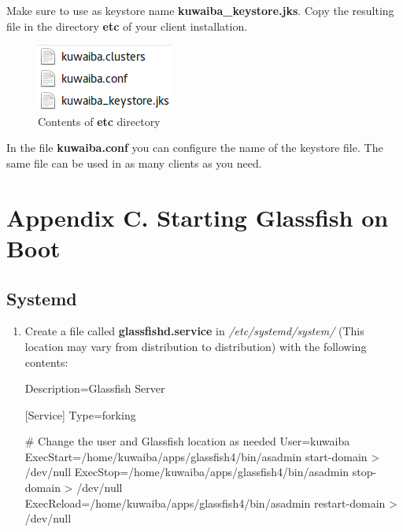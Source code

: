 \documentclass[a4paper]{article}
\begin{document}
\begin{appendices}
\begin{enumerate}
					Make sure to use as keystore name \textbf{kuwaiba\_keystore.jks}. Copy the resulting file in the directory \textbf{etc} of your client installation.\\
					
					\begin{figure}[h!]
						\centering
						\includegraphics[width=0.2\linewidth]{img/etc_contents.png} 	
						\caption{Contents of \textbf{etc} directory}
						\label{fig:etc-contents}
					\end{figure}
					In the file \textbf{kuwaiba.conf} you can configure the name of the keystore file. The same file can be used in as many clients as you need.
				\end{enumerate}
			\section{Appendix C. Starting Glassfish on Boot} \label{app:AppendixC}
				\subsection{Systemd}
				\begin{enumerate}
					\item Create a file called \textbf{glassfishd.service} in \textit{/etc/systemd/system/} (This location may vary from distribution to distribution) with the following contents:
					\begin{verbbox}
						[Unit]
						Description=Glassfish Server
						
						[Service]
						Type=forking
						
						# Change the user and Glassfish location as needed
						User=kuwaiba
						ExecStart=/home/kuwaiba/apps/glassfish4/bin/asadmin start-domain > /dev/null
						ExecStop=/home/kuwaiba/apps/glassfish4/bin/asadmin stop-domain > /dev/null
						ExecReload=/home/kuwaiba/apps/glassfish4/bin/asadmin restart-domain > /dev/null
						

\end{verbbox}
\end{enumerate}
\end{appendices}
\end{document}

